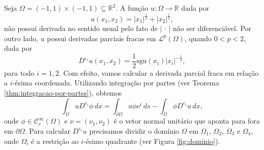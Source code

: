 \documentclass[a4paper, 11pt]{book}
\theoremstyle{definition}
\newcommand{\bR}{\mathbb{R}}
\newcommand{\cC}{\mathcal{C}}
\newcommand{\cL}{\mathcal{L}}
\newcommand{\sgn}{\mathrm{sgn}}
\begin{document}
\begin{ex}
    Seja $\Omega = (-1,1) \times (-1,1) \subseteq \bR^2$. A função $u : \Omega \to \bR$ dada por
    \[
        u(x_1,x_2) = |x_1|^{\frac{1}{2}} + |x_2|^{\frac{1}{2}},
    \]
    não possui derivada no sentido usual pelo fato de $|\,\cdot\,|$ não ser diferenciável.
    Por outro lado, $u$ possui derivadas parciais fracas em $\cL^p(\Omega)$, quando $0 < p < 2$, dada por
    \[
        D^{e_i}u(x_1,x_2) = \frac{1}{2}\sgn(x_i) |x_i|^{-\frac{1}{2}},
    \]
    para todo $i = 1,2$.
    Com efeito, vamos calcular a derivada parcial fraca em relação a $i$-ésima coordenada. Utilizando integração por partes (ver Teorema \ref{thm:integracao-por-partes}), obtemos
    \begin{equation} \label{eq:derivada-fraca-exemplo-legal}
        \int_\Omega u D^{e_i} \phi \,dx = \int_{\partial\Omega} u \phi \nu^i \,ds - \int_\Omega \phi D^{e_i}u \,dx,
    \end{equation}
    onde $\phi \in \cC^\infty_c(\Omega)$ e $\nu = (\nu_1, \nu_2)$ é o vetor normal unitário que aponta para fora em $\partial \Omega$.
    Para calcular $D^{e_i} u$ precisamos dividir o domínio $\Omega$ em $\Omega_1$, $\Omega_2$, $\Omega_3$ e $\Omega_4$, onde $\Omega_i$ é a restrição ao $i$-ésimo quadrante (ver Figura \ref{fig:dominio}).
    \begin{figure}[H]
        \centering
\end{figure}
\end{ex}
\end{document}
